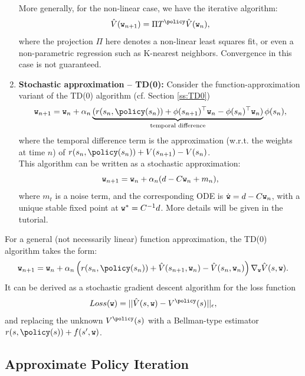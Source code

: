 \begin{enumerate}
More generally, for the non-linear case, we have the iterative algorithm:
$$\hat{V}(\weights_{n+1}) = \Pi T^\policy \hat{V}(\weights_{n}),$$
where the projection $\Pi$ here denotes a non-linear least squares fit, or even a non-parametric regression such as K-nearest neighbors. Convergence in this case is not guaranteed.

\item \textbf{Stochastic approximation -- TD(0):} Consider the function-approximation variant of the TD(0) algorithm (cf. Section \ref{ss:TD0})
\begin{equation*}
    \weights_{n+1} = \weights_n + \alpha_n \underbrace{( r(s_n,\policy(s_n)) + {\ftrs}(s_{n+1})^\top \weights_n - {\ftrs}(s_{n})^\top \weights_n)}_{\textrm{temporal difference}} \ftrs(s_{n}),
\end{equation*}
where the temporal difference term is the approximation (w.r.t. the weights at time $n$) of $r(s_n,\policy(s_n)) + V(s_{n+1}) - V(s_n)$.
\\
This algorithm can be written as a stochastic approximation:
\begin{equation*}
    \texttt{w}_{n+1} = \texttt{w}_n + \alpha_n ( d -  C \texttt{w}_n + m_n ),
\end{equation*}
where $m_t$ is a noise term, and the corresponding ODE is $\dot{\texttt{w}} = d -  C \texttt{w}_n$, with a unique stable fixed point at $\texttt{w}^* = C^{-1}d$. More details will be given in the tutorial.
\end{enumerate}
For a general (not necessarily linear) function approximation, the TD(0) algorithm takes the form:
\begin{equation*}
    \weights_{n+1} = \weights_n + \alpha_n \left( r(s_n,\policy(s_n)) + \hat{V}(s_{n+1},\weights_n) - \hat{V}(s_{n},\weights_n) \right) \nabla_{\weights} \hat{V}(s,\weights).
\end{equation*}
It can be derived as a stochastic gradient descent algorithm for the loss function
\begin{equation*}
    Loss(\weights) = ||\hat{V}(s,\weights) - V^\policy(s)||_\epsilon,
\end{equation*}
and replacing the unknown $V^\policy(s)$ with a Bellman-type estimator $r(s,\policy(s))+f(s',\weights)$.
%

\subsection{Approximate Policy Iteration}

